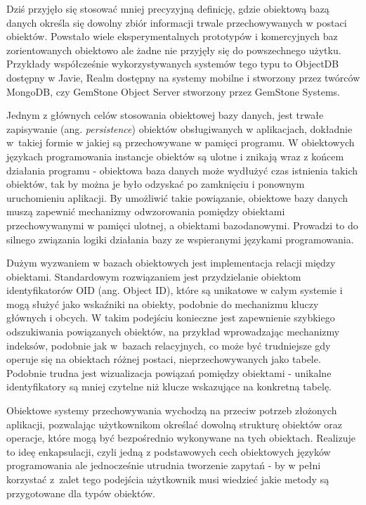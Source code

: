 \documentclass[a4paper,twoside,12pt]{book}
\begin{document}
Dziś przyjęło się stosować mniej precyzyjną definicję, gdzie obiektową bazą danych określa się dowolny zbiór informacji trwale przechowywanych w postaci obiektów. Powstało wiele eksperymentalnych prototypów i komercyjnych baz zorientowanych obiektowo ale żadne nie przyjęły się do powszechnego użytku. Przykłady współcześnie wykorzystywanych systemów tego typu to ObjectDB dostępny w Javie, Realm dostępny na systemy mobilne i stworzony przez twórców MongoDB, czy GemStone Object Server stworzony przez GemStone Systems.

Jednym z głównych celów stosowania obiektowej bazy danych, jest trwałe zapisywanie (ang. \textit{persistence}) obiektów obsługiwanych w aplikacjach, dokładnie w~takiej formie w jakiej są przechowywane w pamięci programu. W obiektowych językach programowania instancje obiektów są ulotne i znikają wraz z końcem działania programu - obiektowa baza danych może wydłużyć czas istnienia takich obiektów, tak by można je było odzyskać po zamknięciu i ponownym uruchomieniu aplikacji. By umożliwić takie powiązanie, obiektowe bazy danych muszą zapewnić mechanizmy odwzorowania pomiędzy obiektami przechowywanymi w pamięci ulotnej, a obiektami bazodanowymi. Prowadzi to do silnego związania logiki działania bazy ze wspieranymi językami programowania.

Dużym wyzwaniem w bazach obiektowych jest implementacja relacji między obiektami. Standardowym rozwiązaniem jest przydzielanie obiektom identyfikatorów OID (ang. Object ID), które są unikatowe w całym systemie i mogą służyć jako wskaźniki na obiekty, podobnie do mechanizmu kluczy głównych i obcych. W takim podejściu konieczne jest zapewnienie szybkiego odszukiwania powiązanych obiektów, na przykład wprowadzając mechanizmy indeksów, podobnie jak w~bazach relacyjnych, co może być trudniejsze gdy operuje się na obiektach różnej postaci, nieprzechowywanych jako tabele. Podobnie trudna jest wizualizacja powiązań pomiędzy obiektami - unikalne identyfikatory są mniej czytelne niż klucze wskazujące na konkretną tabelę.

Obiektowe systemy przechowywania wychodzą na przeciw potrzeb złożonych aplikacji, pozwalając użytkownikom określać dowolną strukturę obiektów oraz operacje, które mogą być bezpośrednio wykonywane na tych obiektach. Realizuje to ideę enkapsulacji, czyli jedną z podstawowych cech obiektowych języków programowania ale jednocześnie utrudnia tworzenie zapytań - by w pełni korzystać z~zalet tego podejścia użytkownik musi wiedzieć jakie metody są przygotowane dla typów obiektów.
\end{document}
